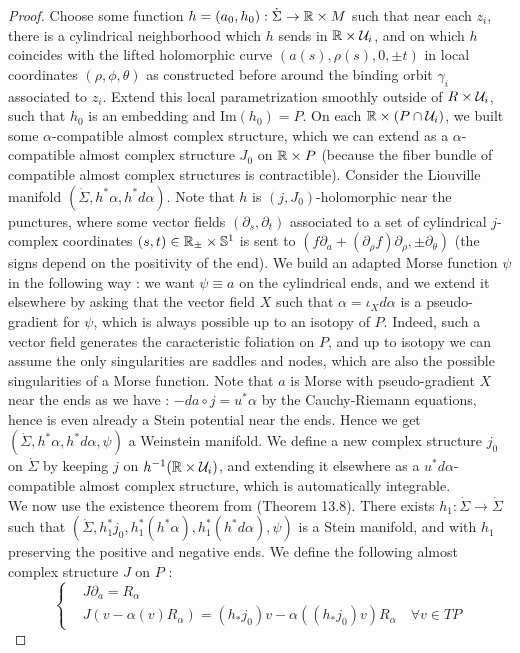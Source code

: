 \documentclass[../main.tex]{subfiles}
\begin{document}
\begin{proof}
Choose some function $h = (a_0,h_0) : \dot{\Sigma}\rightarrow \mathbb{R}\times M$ such that near each $z_i$, there is a cylindrical neighborhood which $h$ sends in $\mathbb{R}\times \mathcal{U}_i$, and on which $h$ coincides with the lifted holomorphic curve $(a(s),\rho(s),0,\pm t)$ in local coordinates $(\rho,\phi,\theta)$ as constructed before around the binding orbit $\gamma_i$ associated to $z_i$. Extend this local parametrization smoothly outside of $R\times \mathcal{U}_i$, such that $h_0$ is an embedding and $\text{Im}(h_0) = P$. On each $\mathbb{R}\times (P\cap\mathcal{U}_i)$, we built some $\alpha$-compatible almost complex structure, which we can extend as a $\alpha$-compatible almost complex structure $J_0$ on $\mathbb{R}\times P$ (because the fiber bundle of compatible almost complex structures is contractible). Consider the Liouville manifold $(\dot\Sigma,h^*\alpha,h^*d\alpha)$. Note that $h$ is $(j,J_0)$-holomorphic near the punctures, where some vector fields $(\partial_s,\partial_t)$ associated to a set of cylindrical $j$-complex coordinates $(s,t)\in\mathbb{R}_\pm \times \mathbb{S}^1$ is sent to $(f\partial_a + (\partial_\rho f)\partial_\rho,\pm\partial_\theta)$ (the signs depend on the positivity of the end). We build an adapted Morse function $\psi$ in the following way : we want $\psi\equiv a$ on the cylindrical ends, and we extend it elsewhere by asking that the vector field $X$ such that $\alpha = \iota_Xd\alpha$ is a pseudo-gradient for $\psi$, which is always possible up to an isotopy of $P$. Indeed, such a vector field generates the caracteristic foliation on $P$, and up to isotopy we can assume the only singularities are saddles and nodes, which are also the possible singularities of a Morse function. Note that $a$ is Morse with pseudo-gradient $X$ near the ends as we have : $-da\circ j = u^*\alpha$ by the Cauchy-Riemann equations, hence is even already a Stein potential near the ends. Hence we get $(\dot\Sigma,h^*\alpha,h^*d\alpha,\psi)$ a Weinstein manifold. We define a new complex structure $j_0$ on $\dot \Sigma$ by keeping $j$ on $h^{-1}(\mathbb{R}\times \mathcal{U}_i)$, and extending it elsewhere as a $u^*d\alpha$-compatible almost complex structure, which is automatically integrable.\\

We now use the existence theorem from \cite{cieliebak_stein_2012} (Theorem 13.8). There exists $h_1:\dot \Sigma \rightarrow \dot\Sigma$ such that $(\dot\Sigma,h_1^*j_0,h_1^*(h^*\alpha),h_1^*(h^*d\alpha),\psi)$ is a Stein manifold, and with $h_1$ preserving the positive and negative ends. We define the following almost complex structure $J$ on $P$ : 
$$\left\{
    \begin{array}{ll}
        & J\partial_a = R_\alpha \\
        & J(v - \alpha(v)R_\alpha) = (h_*j_0)v - \alpha((h_*j_0)v)R_\alpha \quad \forall v \in TP
    \end{array}
\right.$$


\end{proof}
\end{document}
